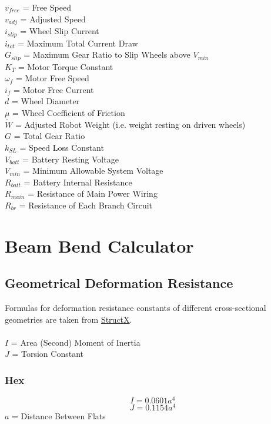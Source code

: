 \documentclass[11pt,a4paper,titlepage]{article}
\begin{document}
	$v_{free}$ = Free Speed \\
	$v_{adj}$ = Adjusted Speed \\
	$i_{slip}$ = Wheel Slip Current \\
	$i_{tot}$ = Maximum Total Current Draw \\
	$G_{slip}$ = Maximum Gear Ratio to Slip Wheels above $V_{min}$ \\
	$K_T$ = Motor Torque Constant \\
	$\omega_f$ = Motor Free Speed \\
	$i_f$ = Motor Free Current \\
	$d$ = Wheel Diameter \\
	$\mu$ = Wheel Coefficient of Friction \\
	$\tilde{W}$ = Adjusted Robot Weight (i.e. weight resting on driven wheels) \\
	$G$ = Total Gear Ratio \\
	$k_{SL}$ = Speed Loss Constant \\
	$V_{batt}$ = Battery Resting Voltage \\
	$V_{min}$ = Minimum Allowable System Voltage \\
	$R_{batt}$ = Battery Internal Resistance \\
	$R_{main}$ = Resistance of Main Power Wiring \\
	$R_{br}$ = Resistance of Each Branch Circuit
	
	\bigskip
	\section{Beam Bend Calculator}
	\subsection{Geometrical Deformation Resistance}
	Formulas for deformation resistance constants of different cross-sectional geometries are taken from \href{https://structx.com/geometric_properties.html}{StructX}. \\ \\
	$I$ = Area (Second) Moment of Inertia \\
	$J$ = Torsion Constant
	\subsubsection{Hex}
	\begin{equation}
		I = 0.0601 a^4
	\end{equation}
	\begin{equation}
		J = 0.1154 a^4
	\end{equation}
	$a$ = Distance Between Flats
	
\end{document}
